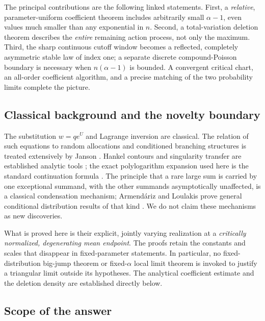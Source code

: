 \documentclass[11pt,a4paper]{article}
\theoremstyle{definition}\newtheorem{definition}[theorem]{Definition}
\theoremstyle{remark}\newtheorem{remark}[theorem]{Remark}
\newcommand{\1}{\mathbf 1}
\begin{document}
The principal contributions are the following linked statements.
First, a \emph{relative}, parameter-uniform coefficient theorem includes
arbitrarily small $\alpha-1$, even values much smaller than any
exponential in $n$. Second, a total-variation deletion theorem describes
the \emph{entire} remaining action process, not only the maximum. Third,
the sharp continuous cutoff window becomes a reflected, completely
asymmetric stable law of index one; a separate discrete
compound-Poisson boundary is necessary when $n(\alpha-1)$ is bounded.
A convergent critical chart, an all-order coefficient algorithm, and a
precise matching of the two probability limits complete the picture.

\subsection{Classical background and the novelty boundary}

The substitution $w=qe^U$ and Lagrange inversion are classical. The
relation of such equations to random allocations and conditioned
branching structures is treated extensively by Janson
\cite{janson}. Hankel contours and singularity transfer are established
analytic tools \cite{flajolet-odlyzko}; the exact polylogarithm expansion
used here is the standard continuation formula \cite{dlmf}.
The principle that a rare large sum is carried by one exceptional
summand, with the other summands asymptotically unaffected, is a classical
condensation mechanism; Armend\'ariz and Loulakis prove general
conditional distribution results of that kind \cite{armendariz}.
We do not claim these mechanisms as new discoveries.

What is proved here is their explicit, jointly varying realization at a
\emph{critically normalized, degenerating mean endpoint}. The proofs
retain the constants and scales that disappear in fixed-parameter
statements. In particular, no fixed-distribution big-jump theorem or
fixed-$\alpha$ local limit theorem is invoked to justify a triangular
limit outside its hypotheses. The analytical coefficient estimate and
the deletion density are established directly below.

\subsection{Scope of the answer}
\end{document}
